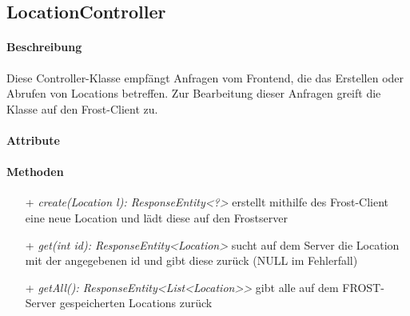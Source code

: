 \subsection{LocationController}

\paragraph{Beschreibung}
Diese Controller-Klasse empfängt Anfragen vom Frontend, die das Erstellen oder Abrufen von Locations betreffen. Zur Bearbeitung dieser Anfragen greift die Klasse auf den Frost-Client zu.


\paragraph{Attribute}

\paragraph{Methoden}
\begin{itemize}
\item[+] \textit{ create(Location l): ResponseEntity<?>}
erstellt mithilfe des Frost-Client eine neue Location und lädt diese auf den Frostserver
\item[+] \textit{get(int id): ResponseEntity<Location>}
sucht auf dem Server die Location mit der angegebenen id und gibt diese zurück (NULL im Fehlerfall)
\item[+] \textit{getAll(): ResponseEntity<List<Location>> }
gibt alle auf dem FROST-Server gespeicherten Locations zurück
\end{itemize}